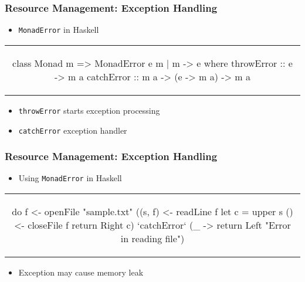 \begin{frame}[fragile, c]
  \frametitle{Resource Management: Exception Handling}
  \begin{center}
  \begin{itemize}
  \item \texttt{MonadError}\citep{liang_monad_1995} in Haskell
  \end{itemize}
  \begin{tabular}[h]{c}
    \begin{haskell}
class Monad m => MonadError e m | m -> e where
    throwError :: e -> m a
    catchError :: m a -> (e -> m a) -> m a
     \end{haskell}
  \end{tabular}
  \begin{itemize}
  \item \texttt{throwError} starts exception processing
  \item \texttt{catchError} exception handler
  \end{itemize}
  \end{center}
\end{frame}

\begin{frame}[fragile, c]
  \frametitle{Resource Management: Exception Handling}
  \begin{center}

  \begin{itemize}
  \item Using \texttt{MonadError} in Haskell
  \end{itemize}
  \begin{tabular}[h]{c}
    \begin{haskell}
      do f <- openFile "sample.txt"
         ((s, f)  <- readLine f
         let c = upper s
         () <- closeFile f
         return \dollar Right c)
             `catchError` (\_ ->
                    return \dollar Left "Error in reading file")
     \end{haskell}
  \end{tabular}
  \begin{itemize}
  \item Exception may cause memory leak
  \end{itemize}
  \end{center}
\end{frame}

